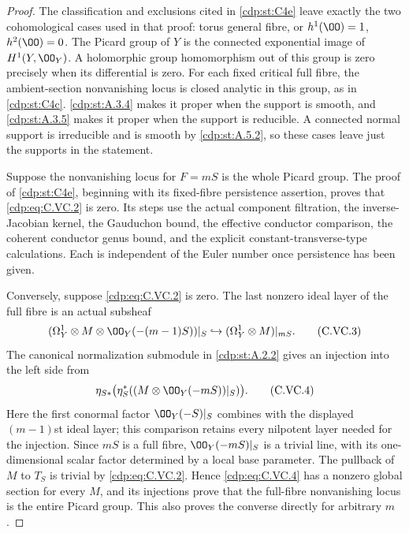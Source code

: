 \begin{proof}
The classification and exclusions cited in \ref{cdp:st:C4e} leave
exactly the two cohomological cases used in that proof:
torus general fibre, or $h^1(\OO)=1$, $h^2(\OO)=0$.
The Picard group of $Y$ is the connected exponential image
of $H^1(Y,\OO_Y)$. A holomorphic group homomorphism out of
this group is zero precisely when its differential is zero.
For each fixed critical full fibre, the ambient-section
nonvanishing locus is closed analytic in this group, as
in \ref{cdp:st:C4c}. \ref{cdp:st:A.3.4} makes it proper when the support is smooth,
and \ref{cdp:st:A.3.5} makes it proper when the support is reducible.
A connected normal support is irreducible and is smooth
by \ref{cdp:st:A.5.2}, so these cases leave just the supports in the
statement.

Suppose the nonvanishing locus for $F=mS$ is the whole
Picard group. The proof of \ref{cdp:st:C4e}, beginning with its
fixed-fibre persistence assertion, proves that \eqref{cdp:eq:C.VC.2}
is zero. Its steps use the actual component filtration,
the inverse-Jacobian kernel, the Gauduchon bound, the
effective conductor comparison, the coherent conductor
genus bound, and the explicit constant-transverse-type
calculations. Each is independent of the Euler number
once persistence has been given.

Conversely, suppose \eqref{cdp:eq:C.VC.2} is zero. The last nonzero
ideal layer of the full fibre is an actual subsheaf
\[
 (\Omega_Y^1\otimes M\otimes\OO_Y(-(m-1)S))|_S
 \hookrightarrow
          (\Omega_Y^1\otimes M)|_{mS}.
 \tag{C.VC.3}\label{cdp:eq:C.VC.3}
\]
The canonical normalization submodule in \ref{cdp:st:A.2.2} gives
an injection into the left side from
\[
 \eta_{S*}\bigl(\eta_S^*((M\otimes\OO_Y(-mS))|_S)\bigr).
 \tag{C.VC.4}\label{cdp:eq:C.VC.4}
\]
Here the first conormal factor $\OO_Y(-S)|_S$ combines
with the displayed $(m-1)$st ideal layer; this comparison
retains every nilpotent layer needed for the injection.
Since $mS$ is a full fibre, $\OO_Y(-mS)|_S$ is a trivial
line, with its one-dimensional scalar factor determined
by a local base parameter. The pullback of $M$ to $T_S$
is trivial by \eqref{cdp:eq:C.VC.2}. Hence \eqref{cdp:eq:C.VC.4} has a nonzero global
section for every $M$, and its injections prove that the
full-fibre nonvanishing locus is the entire Picard group.
This also proves the converse directly for arbitrary $m$.


\end{proof}
